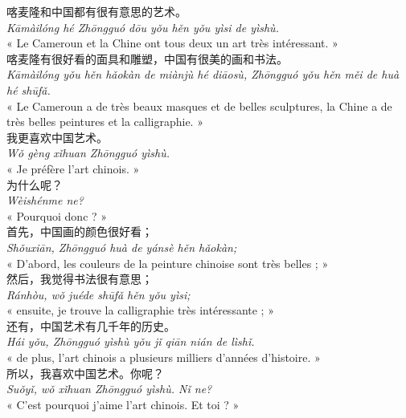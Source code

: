 \documentclass[11pt]{article}
\begin{document}
\begin{textebox}
喀麦隆和中国都有很有意思的艺术。\\
\emph{Kāmàilóng hé Zhōngguó dōu yǒu hěn yǒu yìsi de yìshù.}\\
« Le Cameroun et la Chine ont tous deux un art très intéressant. »\\[4pt]
喀麦隆有很好看的面具和雕塑，中国有很美的画和书法。\\
\emph{Kāmàilóng yǒu hěn hǎokàn de miànjù hé diāosù, Zhōngguó yǒu hěn měi de huà hé shūfǎ.}\\
« Le Cameroun a de très beaux masques et de belles sculptures, la Chine a de très belles peintures et la calligraphie. »\\[4pt]
我更喜欢中国艺术。\\
\emph{Wǒ gèng xǐhuan Zhōngguó yìshù.}\\
« Je préfère l'art chinois. »\\[4pt]
为什么呢？\\
\emph{Wèishénme ne?}\\
« Pourquoi donc ? »\\[4pt]
首先，中国画的颜色很好看；\\
\emph{Shǒuxiān, Zhōngguó huà de yánsè hěn hǎokàn;}\\
« D'abord, les couleurs de la peinture chinoise sont très belles ; »\\[4pt]
然后，我觉得书法很有意思；\\
\emph{Ránhòu, wǒ juéde shūfǎ hěn yǒu yìsi;}\\
« ensuite, je trouve la calligraphie très intéressante ; »\\[4pt]
还有，中国艺术有几千年的历史。\\
\emph{Hái yǒu, Zhōngguó yìshù yǒu jǐ qiān nián de lìshǐ.}\\
« de plus, l'art chinois a plusieurs milliers d'années d'histoire. »\\[4pt]
所以，我喜欢中国艺术。你呢？\\
\emph{Suǒyǐ, wǒ xǐhuan Zhōngguó yìshù. Nǐ ne?}\\
« C'est pourquoi j'aime l'art chinois. Et toi ? »
\end{textebox}
\end{document}
